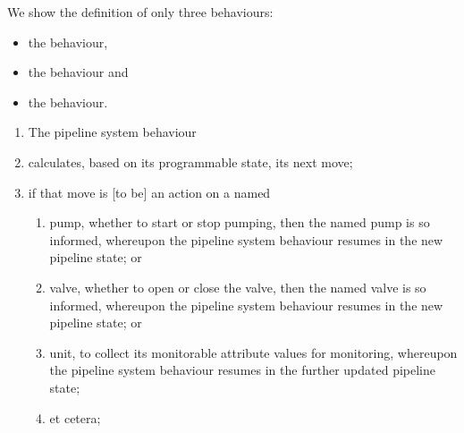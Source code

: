 \label{pipe:Behaviour Definitions}
%

\begynd
\pind We show the definition of only three behaviours:
\afslut
\begin{itemize}
\item  the  behaviour,
\item  the  behaviour and
\item  the  behaviour.
\end{itemize}


\begin{enumerate}\setei
\item \label{beh-def-1000} The pipeline system behaviour
\item \label{beh-def-1100} calculates, based on its programmable
                           state, its next move;  
\item \label{beh-def-1200} if that move is [to be] an action on a named 
\begin{enumerate}
\item \label{beh-def-1300} pump, whether to start or stop
                           pumping, then the named pump is so
                           informed, whereupon the  pipeline system
                           behaviour 
                           resumes in the new pipeline state; or
\item \label{beh-def-1400} valve, whether to open or close
                           the valve, then the named valve is so
                           informed,  whereupon the  pipeline system
                           behaviour 
                           resumes in the new pipeline state; or
\item \label{beh-def-1450} unit, to collect its
                           monitorable attribute values for
                           monitoring,  whereupon the  pipeline system
                           behaviour 
                           resumes in the further updated pipeline state; 
\item \label{beh-def-1500} et cetera;
\end{enumerate}
\savei\end{enumerate}
\mnewfoil

